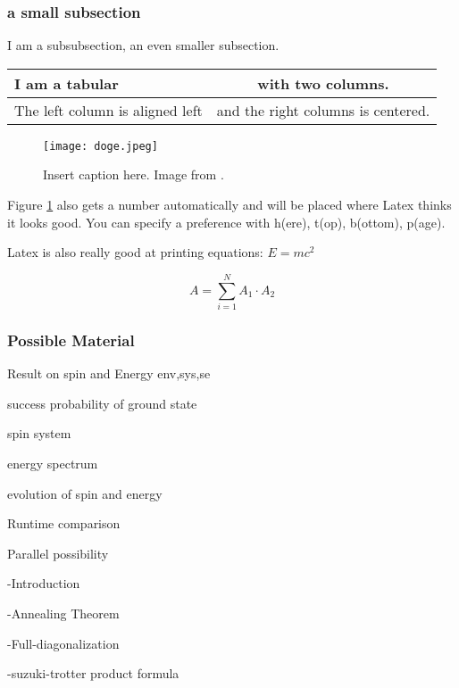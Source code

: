 \documentclass[twoside,a4paper,article]{combine}
\begin{document}
\subsubsection{a small subsection}
I am a subsubsection, an even smaller subsection.

\begin{tabular}{|l|c|}
\hline
I am a tabular & with two columns. \\
\hline
The left column is aligned left & and the right columns is centered. \\
\hline
\end{tabular}


\begin{figure}[h]
\centering
\texttt{[image: doge.jpeg]}
\caption{Insert caption here. Image from \cite{lenna}. }
\label{example_figure}
\end{figure}
Figure \ref{example_figure} also gets a number automatically and will be placed where Latex thinks it looks good. You can specify a preference with h(ere), t(op), b(ottom), p(age).



Latex is also really good at printing equations: $E=mc^2$

\begin{equation}
A = \sum_{i=1}^N A_1 \cdot A_2
\end{equation}

\subsubsection{Possible Material}
Result on spin and Energy env,sys,se

success probability of ground state

spin system

energy spectrum

evolution of spin and energy

Runtime comparison

Parallel possibility

-Introduction

-Annealing Theorem

-Full-diagonalization

-suzuki-trotter product formula
\end{document}
